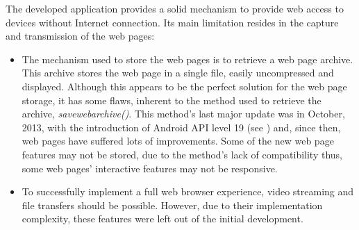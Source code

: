 The developed application provides a solid mechanism to provide web access to devices without Internet connection. Its main limitation resides in the capture and transmission of the web pages:

\begin{itemize}
	
	\item The mechanism used to store the web pages is to retrieve a web page archive. This archive stores the web page in a single file, easily uncompressed and displayed. Although this appears to be the perfect solution for the web page storage, it has some flaws, inherent to the method used to retrieve the archive, \textit{savewebarchive()}. This method's last major update was in October, 2013, with the introduction of Android API level 19 (see \cite{kitkat}) and, since then, web pages have suffered lots of improvements. Some of the new web page features may not be stored, due to the method's lack of compatibility thus, some web pages' interactive features may not be responsive.
	
	\item To successfully implement a full web browser experience, video streaming and file transfers should be possible. However, due to their implementation complexity, these features were left out of the initial development.
	
\end{itemize}









